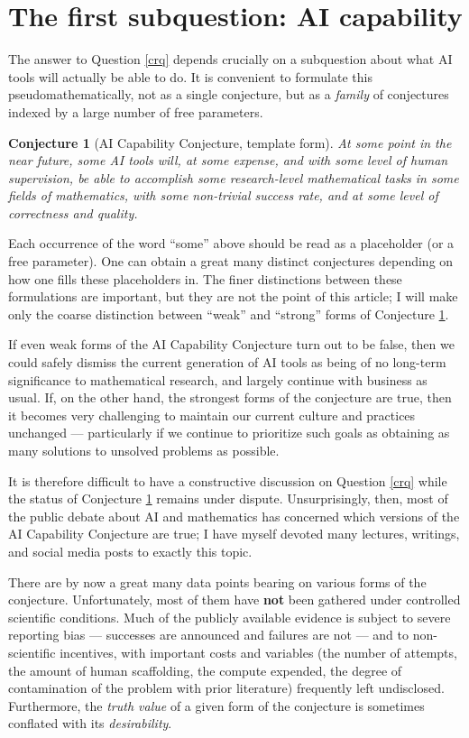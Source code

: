 \documentclass[12pt]{amsart}
\newtheorem{conjecture}{Conjecture}[section]
\theoremstyle{definition}
\begin{document}
\section{The first subquestion: AI capability}

The answer to Question \ref{crq} depends crucially on a subquestion about what AI tools will actually be able to do.  It is convenient to formulate this pseudomathematically, not as a single conjecture, but as a \emph{family} of conjectures indexed by a large number of free parameters.

\begin{conjecture}[AI Capability Conjecture, template form]\label{aicc} At \emph{some} point in the near future, \emph{some} AI tools will, at \emph{some} expense, and with \emph{some} level of human supervision, be able to accomplish \emph{some} research-level mathematical tasks in \emph{some} fields of mathematics, with \emph{some} non-trivial success rate, and at \emph{some} level of correctness and quality.
\end{conjecture}

Each occurrence of the word ``some'' above should be read as a placeholder (or a free parameter).  One can obtain a great many distinct conjectures depending on how one fills these placeholders in.  The finer distinctions between these formulations are important, but they are not the point of this article; I will make only the coarse distinction between ``weak'' and ``strong'' forms of Conjecture \ref{aicc}.

If even weak forms of the AI Capability Conjecture turn out to be false, then we could safely dismiss the current generation of AI tools as being of no long-term significance to mathematical research, and largely continue with business as usual.  If, on the other hand, the strongest forms of the conjecture are true, then it becomes very challenging to maintain our current culture and practices unchanged --- particularly if we continue to prioritize such goals as obtaining as many solutions to unsolved problems as possible.

It is therefore difficult to have a constructive discussion on Question \ref{crq} while the status of Conjecture \ref{aicc} remains under dispute.  Unsurprisingly, then, most of the public debate about AI and mathematics has concerned which versions of the AI Capability Conjecture are true; I have myself devoted many lectures, writings, and social media posts to exactly this topic.

There are by now a great many data points bearing on various forms of the conjecture.  Unfortunately, most of them have \textbf{not} been gathered under controlled scientific conditions.  Much of the publicly available evidence is subject to severe reporting bias --- successes are announced and failures are not --- and to non-scientific incentives, with important costs and variables (the number of attempts, the amount of human scaffolding, the compute expended, the degree of contamination of the problem with prior literature) frequently left undisclosed.  Furthermore, the \emph{truth value} of a given form of the conjecture is sometimes conflated with its \emph{desirability}.  
\end{document}
